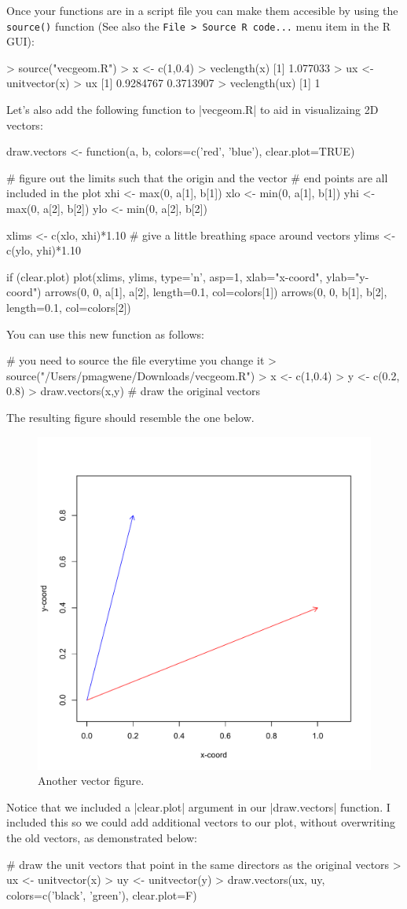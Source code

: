 Once your functions are in a script file you can make them accesible by
using the \lstinline!source()! function (See also the
\lstinline!File > Source R code...! menu item in the R GUI):
%
\begin{R}
> source("vecgeom.R")
> x <- c(1,0.4)
> veclength(x)
[1] 1.077033
> ux <- unitvector(x)
> ux
[1] 0.9284767 0.3713907
> veclength(ux)
[1] 1
\end{R}

Let's also add the following function to |vecgeom.R| to aid in visualizaing 2D vectors:
%
\begin{R}
draw.vectors <- function(a, b, colors=c('red', 'blue'), clear.plot=TRUE){
    
    # figure out the limits such that the origin and the vector
    # end points are all included in the plot
    xhi <- max(0, a[1], b[1])
    xlo <- min(0, a[1], b[1])
    yhi <- max(0, a[2], b[2])
    ylo <- min(0, a[2], b[2])
    
    xlims <- c(xlo, xhi)*1.10 # give a little breathing space around vectors
    ylims <- c(ylo, yhi)*1.10

    if (clear.plot){
        plot(xlims, ylims, type='n', asp=1, xlab="x-coord", ylab="y-coord") 
    }
    arrows(0, 0, a[1], a[2], length=0.1, col=colors[1])
    arrows(0, 0, b[1], b[2], length=0.1, col=colors[2])
}
\end{R}
%
You can use this new function as follows:
\begin{R}
# you need to source the file everytime you change it
> source("/Users/pmagwene/Downloads/vecgeom.R")
> x <- c(1,0.4)
> y <- c(0.2, 0.8)
> draw.vectors(x,y)  # draw the original vectors
\end{R}
%
The resulting figure should resemble the one below.
%
\begin{figure}[htbp]
\centering
\includegraphics[width=0.33\columnwidth]{./figures/hands-on2/vecfig2.pdf}
\caption{Another vector figure.}
\end{figure}

Notice that we included a |clear.plot| argument in our |draw.vectors| function. I included this so we could add additional vectors to our plot, without overwriting the old vectors, as demonstrated below:
\begin{R}
# draw the unit vectors that point in the same directors as the original vectors
> ux <- unitvector(x)
> uy <- unitvector(y)
> draw.vectors(ux, uy, colors=c('black', 'green'), clear.plot=F)
\end{R}

